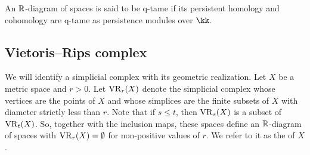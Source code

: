An $\mathbb{R}$-diagram of spaces is said to be q-tame if its persistent homology and cohomology are q-tame as persistence modules over $\kk$.

%
%
%

\subsection{Vietoris--Rips complex}\label{ss:vietoris-rips}

We will identify a simplicial complex with its geometric realization.
Let $X$ be a metric space and $r > 0$.
Let $\operatorname{VR}_r(X)$ denote the simplicial complex whose vertices are the points of $X$ and whose simplices are the finite subsets of $X$ with diameter strictly less than $r$.
Note that if $s \leq t$, then $\operatorname{VR}_s(X)$ is a subset of $\operatorname{VR}_t(X)$.
So, together with the inclusion maps, these spaces define an $\mathbb{R}$-diagram of spaces with $\operatorname{VR}_r(X) = \emptyset$ for non-positive values of $r$.
We refer to it as the  of $X$.

